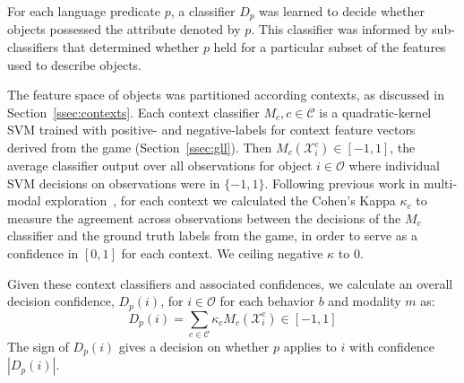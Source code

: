 For each language predicate $p$, a classifier $D_p$ was learned to decide whether objects possessed the attribute denoted by $p$.
This classifier was informed by sub-classifiers that determined whether $p$ held for a particular subset of the features used to describe objects.

The feature space of objects was partitioned according contexts, as discussed in Section~\ref{ssec:contexts}.
Each context classifier $M_{c}, c\in\mathcal{C}$ is a quadratic-kernel SVM trained with positive- and negative-labels for context feature vectors derived from the \ispy game (Section~\ref{ssec:gll}).
Then $M_{c}(\mathcal{X}_i^c)\in [-1,1]$, the average classifier output over all observations for object $i\in\mathcal{O}$ where individual SVM decisions on observations were in $\{-1,1\}$.
Following previous work in multi-modal exploration~\cite{sinapov:icra14}, for each context we calculated the Cohen's Kappa $\kappa_{c}$ to measure the agreement across observations between the decisions of the $M_{c}$ classifier and the ground truth labels from the \ispy game, in order to serve as a confidence in $[0,1]$ for each context.
We ceiling negative $\kappa$ to $0$.

Given these context classifiers and associated confidences, we calculate an overall decision confidence, $D_p(i)$, for $i\in\mathcal{O}$ for each behavior $b$ and modality $m$ as:
\begin{equation}
	D_p(i) = \sum_{c\in\mathcal{C}}{\kappa_{c} M_{c}(\mathcal{X}_i^c)} \in [-1,1]
\end{equation}
The sign of $D_p(i)$ gives a decision on whether $p$ applies to $i$ with confidence $|D_p(i)|$.
